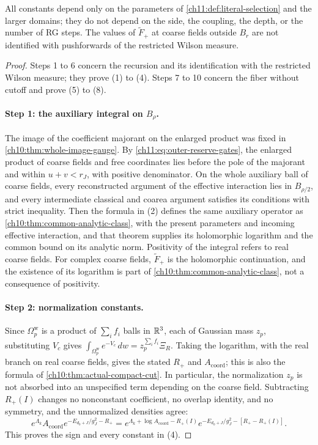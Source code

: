 \begin{theorem}
\begin{enumerate}
\end{enumerate}
All constants depend only on the parameters of \cref{ch11:def:literal-selection} and the larger domains; they do not depend on the side, the coupling, the depth, or the number of RG steps. The values of $\widetilde F_+$ at coarse fields outside $B_r$ are not identified with pushforwards of the restricted Wilson measure.
\end{theorem}

\begin{proof}
Steps 1 to 6 concern the recursion and its identification with the restricted Wilson measure; they prove (1) to (4). Steps 7 to 10 concern the fiber without cutoff and prove (5) to (8).

\paragraph{Step 1: the auxiliary integral on $B_\rho$.}
The image of the coefficient majorant on the enlarged product was fixed in \cref{ch10:thm:whole-image-gauge}. By \eqref{ch11:eq:outer-reserve-gates}, the enlarged product of coarse fields and free coordinates lies before the pole of the majorant and within $u+v<r_J$, with positive denominator. On the whole auxiliary ball of coarse fields, every reconstructed argument of the effective interaction lies in $B_{\rho/2}$, and every intermediate classical and coarea argument satisfies its conditions with strict inequality. Then the formula in (2) defines the same auxiliary operator as \cref{ch10:thm:common-analytic-class}, with the present parameters and incoming effective interaction, and that theorem supplies its holomorphic logarithm and the common bound on its analytic norm. Positivity of the integral refers to real coarse fields. For complex coarse fields, $\widetilde F_+$ is the holomorphic continuation, and the existence of its logarithm is part of \cref{ch10:thm:common-analytic-class}, not a consequence of positivity.

\paragraph{Step 2: normalization constants.}
Since $\Omega_p^{\mathrm w}$ is a product of $\sum_if_i$ balls in $\mathbb R^3$, each of Gaussian mass $z_p$, substituting $V_c$ gives $\int_{\Omega_p^{\mathrm w}}e^{-V_c}\,dw=z_p^{\sum_if_i}\Xi_R$. Taking the logarithm, with the real branch on real coarse fields, gives the stated $R_+$ and $A_{\mathrm{coord}}$; this is also the formula of \cref{ch10:thm:actual-compact-cut}. In particular, the normalization $z_p$ is not absorbed into an unspecified term depending on the coarse field. Subtracting $R_+(I)$ changes no nonconstant coefficient, no overlap identity, and no symmetry, and the unnormalized densities agree:
\[
 e^{\Lambda_k}A_{\mathrm{coord}}e^{-E_{d_0+J}/g_J^2-R_+}
 =e^{\Lambda_k+\log A_{\mathrm{coord}}-R_+(I)}e^{-E_{d_0+J}/g_J^2-[R_+-R_+(I)]}.
\]
This proves the sign and every constant in (4).


\end{proof}
